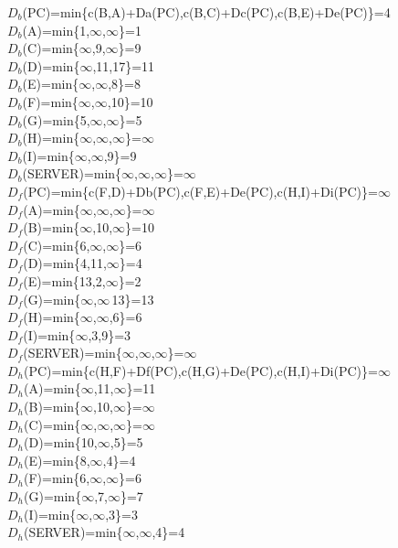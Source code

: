 \documentclass{article}
\begin{document}
$D_b$(PC)=min\{c(B,A)+Da(PC),c(B,C)+Dc(PC),c(B,E)+De(PC)\}=4\\
$D_b$(A)=min\{1,$\infty$,$\infty$\}=1\\
$D_b$(C)=min\{$\infty$,9,$\infty$\}=9\\
$D_b$(D)=min\{$\infty$,11,17\}=11\\
$D_b$(E)=min\{$\infty$,$\infty$,8\}=8\\
$D_b$(F)=min\{$\infty$,$\infty$,10\}=10\\
$D_b$(G)=min\{5,$\infty$,$\infty$\}=5\\
$D_b$(H)=min\{$\infty$,$\infty$,$\infty$\}=$\infty$\\
$D_b$(I)=min\{$\infty$,$\infty$,9\}=9\\
$D_b$(SERVER)=min\{$\infty$,$\infty$,$\infty$\}=$\infty$\\

$D_f$(PC)=min\{c(F,D)+Db(PC),c(F,E)+De(PC),c(H,I)+Di(PC)\}=$\infty$\\
$D_f$(A)=min\{$\infty$,$\infty$,$\infty$\}=$\infty$\\
$D_f$(B)=min\{$\infty$,10,$\infty$\}=10\\
$D_f$(C)=min\{6,$\infty$,$\infty$\}=6\\
$D_f$(D)=min\{4,11,$\infty$\}=4\\
$D_f$(E)=min\{13,2,$\infty$\}=2\\
$D_f$(G)=min\{$\infty$,$\infty$\,13\}=13\\
$D_f$(H)=min\{$\infty$,$\infty$,6\}=6\\
$D_f$(I)=min\{$\infty$,3,9\}=3\\
$D_f$(SERVER)=min\{$\infty$,$\infty$,$\infty$\}=$\infty$\\

$D_h$(PC)=min\{c(H,F)+Df(PC),c(H,G)+De(PC),c(H,I)+Di(PC)\}=$\infty$\\
$D_h$(A)=min\{$\infty$,11,$\infty$\}=11\\
$D_h$(B)=min\{$\infty$,10,$\infty$\}=$\infty$\\
$D_h$(C)=min\{$\infty$,$\infty$,$\infty$\}=$\infty$\\
$D_h$(D)=min\{10,$\infty$,5\}=5\\
$D_h$(E)=min\{8,$\infty$,4\}=4\\
$D_h$(F)=min\{6,$\infty$,$\infty$\}=6\\
$D_h$(G)=min\{$\infty$,7,$\infty$\}=7\\
$D_h$(I)=min\{$\infty$,$\infty$,3\}=3\\
$D_h$(SERVER)=min\{$\infty$,$\infty$,4\}=4\\\\\\
\end{document}
